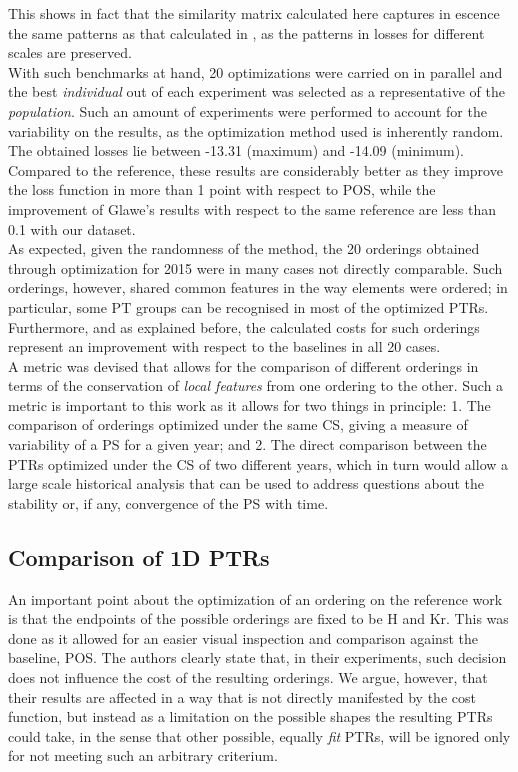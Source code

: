 \documentclass[article]{article}
\begin{document}
This shows in fact that the similarity matrix calculated here captures in escence the same patterns as that calculated in \cite{Glawe_2016}, as the patterns in losses for different scales are preserved.\\

With such benchmarks at hand, 20 optimizations were carried on in parallel and the best \textit{individual} out of each experiment was selected as a representative of the \textit{population}. Such an amount of experiments were performed to account for the variability on the results, as the optimization method used is inherently random. The obtained losses lie between -13.31 (maximum) and -14.09 (minimum). Compared to the reference, these results are considerably better as they improve the loss function in more than 1 point with respect to POS, while the improvement of Glawe's results with respect to the same reference are less than 0.1 with our dataset. \\

As expected, given the randomness of the method, the 20 orderings obtained through optimization for 2015 were in many cases not directly comparable. Such orderings, however, shared common features in the way elements were ordered; in particular, some PT groups can be recognised in most of the optimized PTRs. Furthermore, and as explained before, the calculated costs for such orderings represent an improvement with respect to the baselines in all 20 cases. \\

A metric was devised that allows for the comparison of different orderings in terms of the conservation of \textit{local features} from one ordering to the other. Such a metric is important to this work as it allows for two things in principle: 1. The comparison of orderings optimized under the same CS, giving a measure of variability of a PS for a given year; and 2. The direct comparison between the PTRs optimized under the CS of two different years, which in turn would allow a large scale historical analysis that can be used to address questions about the stability or, if any, convergence of the PS with time. \\

\subsection{Comparison of 1D PTRs}

An important point about the optimization of an ordering on the reference work \cite{Glawe_2016} is that the endpoints of the possible orderings are fixed to be H and Kr. This was done as it allowed for an easier visual inspection and comparison against the baseline, POS. The authors clearly state that, in their experiments, such decision does not influence the cost of the resulting orderings. We argue, however, that their results are affected in a way that is not directly manifested by the cost function, but instead as a limitation on the possible shapes the resulting PTRs could take, in the sense that other possible, equally \textit{fit} PTRs, will be ignored only for not meeting such an arbitrary criterium.
\end{document}
